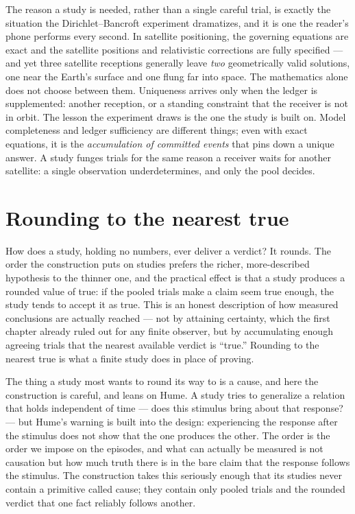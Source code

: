 The reason a study is needed, rather than a single careful trial, is exactly the situation the
Dirichlet--Bancroft experiment dramatizes, and it is one the reader's phone performs every second. In
satellite positioning, the governing equations are exact and the satellite positions and relativistic
corrections are fully specified --- and yet three satellite receptions generally leave \emph{two}
geometrically valid solutions, one near the Earth's surface and one flung far into space. The
mathematics alone does not choose between them. Uniqueness arrives only when the ledger is
supplemented: another reception, or a standing constraint that the receiver is not in orbit. The
lesson the experiment draws is the one the study is built on. Model completeness and ledger
sufficiency are different things; even with exact equations, it is the \emph{accumulation of committed
events} that pins down a unique answer. A study funges trials for the same reason a receiver waits for
another satellite: a single observation underdetermines, and only the pool decides.

\section{Rounding to the nearest true}
\label{se:rounding-to-the-nearest-true}

How does a study, holding no numbers, ever deliver a verdict? It rounds. The order the construction
puts on studies prefers the richer, more-described hypothesis to the thinner one, and the practical
effect is that a study produces a rounded value of true: if the pooled trials make a claim seem true
enough, the study tends to accept it as true. This is an honest description of how measured conclusions
are actually reached --- not by attaining certainty, which the first chapter already ruled out for any
finite observer, but by accumulating enough agreeing trials that the nearest available verdict is
``true.'' Rounding to the nearest true is what a finite study does in place of proving.

The thing a study most wants to round its way to is a cause, and here the construction is careful, and
leans on Hume. A study tries to generalize a relation that holds independent of time --- does this
stimulus bring about that response? --- but Hume's warning is built into the design: experiencing the
response after the stimulus does not show that the one produces the other. The order is the order we
impose on the episodes, and what can actually be measured is not causation but how much truth there is
in the bare claim that the response follows the stimulus. The construction takes this seriously enough
that its studies never contain a primitive called cause; they contain only pooled trials and the
rounded verdict that one fact reliably follows another.

